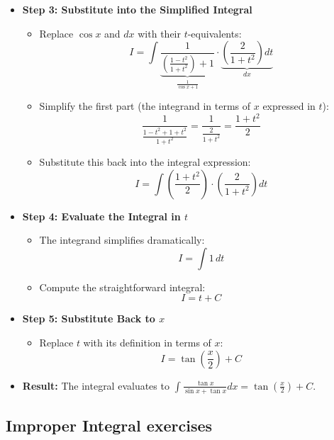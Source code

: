 \begin{cascade}
\begin{itemize}
		\item \textbf{Step 3: Substitute into the Simplified Integral}
		      \begin{itemize}
			      \item Replace $\cos x$ and $dx$ with their $t$-equivalents:
			            \[ I = \int \underbrace{\frac{1}{\left(\frac{1-t^2}{1+t^2}\right) + 1}}_{\frac{1}{\cos x + 1}} \cdot \underbrace{\left(\frac{2}{1+t^2}\right) dt}_{dx} \]
			      \item Simplify the first part (the integrand in terms of $x$ expressed in $t$):
			            \[ \frac{1}{\frac{1-t^2 + 1+t^2}{1+t^2}} = \frac{1}{\frac{2}{1+t^2}} = \frac{1+t^2}{2} \]
			      \item Substitute this back into the integral expression:
			            \[ I = \int \left(\frac{1+t^2}{2}\right) \cdot \left(\frac{2}{1+t^2}\right) dt \]
		      \end{itemize}
		\item \textbf{Step 4: Evaluate the Integral in $t$}
		      \begin{itemize}
			      \item The integrand simplifies dramatically:
			            \[ I = \int 1 \, dt \]
			      \item Compute the straightforward integral:
			            \[ I = t + C \]
		      \end{itemize}
		\item \textbf{Step 5: Substitute Back to $x$}
		      \begin{itemize}
			      \item Replace $t$ with its definition in terms of $x$:
			            \[ I = \tan\left(\frac{x}{2}\right) + C \]
		      \end{itemize}
		\item \textbf{Result:} The integral evaluates to $\int \frac{\tan x}{\sin x + \tan x} dx = \tan\left(\frac{x}{2}\right) + C$.
	\end{itemize}
\end{cascade}

\clearpage

\subsection{Improper Integral exercises}

